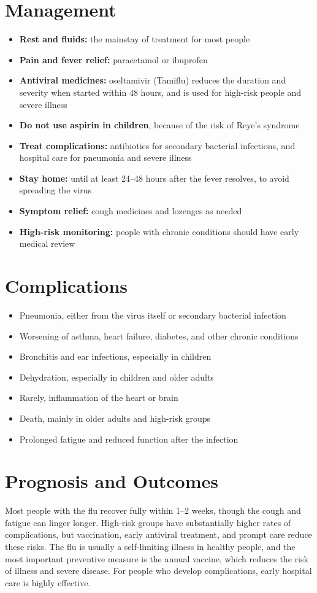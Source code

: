 \section*{Management}
\begin{itemize}
    \item \textbf{Rest and fluids:} the mainstay of treatment for most people
    \item \textbf{Pain and fever relief:} paracetamol or ibuprofen
    \item \textbf{Antiviral medicines:} oseltamivir (Tamiflu) reduces the duration and severity when started within 48 hours, and is used for high-risk people and severe illness
    \item \textbf{Do not use aspirin in children}, because of the risk of Reye's syndrome
    \item \textbf{Treat complications:} antibiotics for secondary bacterial infections, and hospital care for pneumonia and severe illness
    \item \textbf{Stay home:} until at least 24--48 hours after the fever resolves, to avoid spreading the virus
    \item \textbf{Symptom relief:} cough medicines and lozenges as needed
    \item \textbf{High-risk monitoring:} people with chronic conditions should have early medical review
\end{itemize}

\section*{Complications}
\begin{itemize}
    \item Pneumonia, either from the virus itself or secondary bacterial infection
    \item Worsening of asthma, heart failure, diabetes, and other chronic conditions
    \item Bronchitis and ear infections, especially in children
    \item Dehydration, especially in children and older adults
    \item Rarely, inflammation of the heart or brain
    \item Death, mainly in older adults and high-risk groups
    \item Prolonged fatigue and reduced function after the infection
\end{itemize}

\section*{Prognosis and Outcomes}
Most people with the flu recover fully within 1--2 weeks, though the cough and fatigue can linger longer. High-risk groups have substantially higher rates of complications, but vaccination, early antiviral treatment, and prompt care reduce these risks. The flu is usually a self-limiting illness in healthy people, and the most important preventive measure is the annual vaccine, which reduces the risk of illness and severe disease. For people who develop complications, early hospital care is highly effective.

